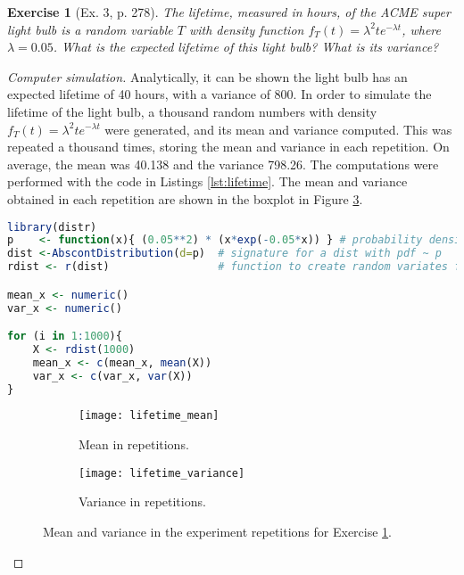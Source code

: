 \documentclass[letterpaper, 10 pt, conference]{article}
\newtheorem{ex}{Exercise}
\begin{document}
\begin{ex}[Ex. 3, p. 278]\label{ex:lifetime}
	The lifetime, measured in hours, of the ACME super light bulb is a random variable $T$ with density function $f_T (t) = \lambda^2 t e^{-\lambda t}$, where $\lambda = 0.05$. What is the expected lifetime of this light bulb? What is its variance?
\end{ex}
\begin{proof}[Computer simulation]
	Analytically, it can be shown the light bulb has an expected lifetime of 40 hours, with a variance of 800. In order to simulate the lifetime of the light bulb, a thousand random numbers with density $f_T (t) = \lambda^2 t e^{-\lambda t}$ were generated, and its mean and variance computed. This was repeated a thousand times, storing the mean and variance in each repetition. On average, the mean was 40.138 and the variance 798.26. The computations were performed with the code in Listings \ref{lst:lifetime}. The mean and variance obtained in each repetition are shown in the boxplot in Figure \ref{fig:lifetime}.
	
	\begin{lstlisting}[language=R, caption={Code for Exercise \ref{ex:lifetime}.}, label={lst:lifetime} ]
library(distr)
p    <- function(x){ (0.05**2) * (x*exp(-0.05*x)) } # probability density function
dist <-AbscontDistribution(d=p)  # signature for a dist with pdf ~ p
rdist <- r(dist)                 # function to create random variates from p

mean_x <- numeric()
var_x <- numeric()

for (i in 1:1000){
	X <- rdist(1000)
	mean_x <- c(mean_x, mean(X))
	var_x <- c(var_x, var(X))
}
	\end{lstlisting}
	
	\begin{figure}
		\centering
		\begin{subfigure}{0.45\linewidth}
			\texttt{[image: lifetime\_mean]}
			\caption{Mean in repetitions.}
			\label{fig:lifetime_mean}
		\end{subfigure}
		\hfill
		\begin{subfigure}{0.45\linewidth}
			\texttt{[image: lifetime\_variance]}
			\caption{Variance in repetitions.}
			\label{fig:lifetime_variance}
		\end{subfigure}
		\caption{Mean and variance in the experiment repetitions for Exercise \ref{ex:lifetime}.} 
		\label{fig:lifetime}
	\end{figure}
	
\end{proof}
\end{document}
